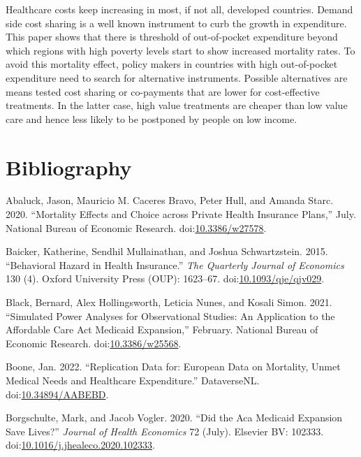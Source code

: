 \documentclass[a4paper,12pt]{article}
\begin{document}
Healthcare costs keep increasing in most, if not all, developed countries. Demand side cost sharing is a well known instrument to curb the growth in expenditure. This paper shows that there is threshold of out-of-pocket expenditure beyond which regions with high poverty levels start to show increased mortality rates. To avoid this mortality effect, policy makers in countries with high out-of-pocket expenditure need to search for alternative instruments. Possible alternatives are means tested cost sharing or co-payments that are lower for cost-effective treatments. In the latter case, high value treatments are cheaper than low value care and hence less likely to be postponed by people on low income.


\section{Bibliography}
\label{sec:orgb929ec5}

\hypertarget{citeproc_bib_item_1}{Abaluck, Jason, Mauricio M. Caceres Bravo, Peter Hull, and Amanda Starc. 2020. “Mortality Effects and Choice across Private Health Insurance Plans,” July. National Bureau of Economic Research. doi:\href{https://doi.org/10.3386/w27578}{10.3386/w27578}.}

\hypertarget{citeproc_bib_item_2}{Baicker, Katherine, Sendhil Mullainathan, and Joshua Schwartzstein. 2015. “Behavioral Hazard in Health Insurance.” \textit{The Quarterly Journal of Economics} 130 (4). Oxford University Press (OUP): 1623–67. doi:\href{https://doi.org/10.1093/qje/qjv029}{10.1093/qje/qjv029}.}

\hypertarget{citeproc_bib_item_3}{Black, Bernard, Alex Hollingsworth, Leticia Nunes, and Kosali Simon. 2021. “Simulated Power Analyses for Observational Studies: An Application to the Affordable Care Act Medicaid Expansion,” February. National Bureau of Economic Research. doi:\href{https://doi.org/10.3386/w25568}{10.3386/w25568}.}

\hypertarget{citeproc_bib_item_4}{Boone, Jan. 2022. “Replication Data for: European Data on Mortality, Unmet Medical Needs and Healthcare Expenditure.” DataverseNL. doi:\href{https://doi.org/10.34894/AABEBD}{10.34894/AABEBD}.}

\hypertarget{citeproc_bib_item_5}{Borgschulte, Mark, and Jacob Vogler. 2020. “Did the Aca Medicaid Expansion Save Lives?” \textit{Journal of Health Economics} 72 (July). Elsevier BV: 102333. doi:\href{https://doi.org/10.1016/j.jhealeco.2020.102333}{10.1016/j.jhealeco.2020.102333}.}
\end{document}
